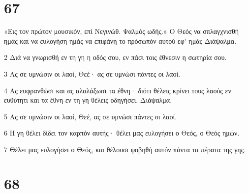 \chapter{67}

\par «Εις τον πρώτον μουσικόν, επί Νεγινώθ. Ψαλμός ωδής.» Ο Θεός να σπλαγχνισθή ημάς και να ευλογήση ημάς να επιφάνη το πρόσωπόν αυτού εφ' ημάς Διάψαλμα.
\par 2 Διά να γνωρισθή εν τη γη η οδός σου, εν πάσι τοις έθνεσιν η σωτηρία σου.
\par 3 Ας σε υμνώσιν οι λαοί, Θεέ· ας σε υμνώσι πάντες οι λαοί.
\par 4 Ας ευφρανθώσι και ας αλαλάξωσι τα έθνη· διότι θέλεις κρίνει τους λαούς εν ευθύτητι και τα έθνη εν τη γη θέλεις οδηγήσει. Διάψαλμα.
\par 5 Ας σε υμνώσιν οι λαοί, Θεέ, ας σε υμνώσι πάντες οι λαοί.
\par 6 Η γη θέλει δίδει τον καρπόν αυτής· θέλει μας ευλογήσει ο Θεός, ο Θεός ημών.
\par 7 Θέλει μας ευλογήσει ο Θεός, και θέλουσι φοβηθή αυτόν πάντα τα πέρατα της γης.

\chapter{68}

